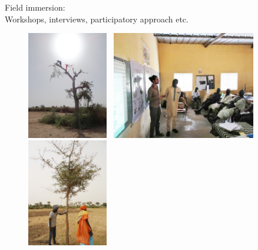 \documentclass[aspectratio=169]{beamer}
\begin{document}
\begin{frame}{Field immersion: \\
    Workshops, interviews, participatory approach etc.}
    \begin{center}
        \vspace{-1em}
        \begin{figure}
            \centering
            \includegraphics[height = 4.7cm]{img/emondage_faidherbia.png}~
            \includegraphics[height = 4.7cm]{img/atelierLucas.jpg}~
            \includegraphics[height = 4.7cm]{img/entretienChamp.jpg}
        \end{figure}
    \end{center}
\end{frame}
\end{document}
